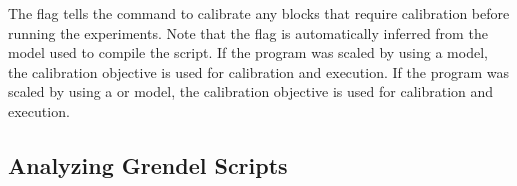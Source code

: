 The  flag tells the \expdriver command to calibrate any
blocks that require calibration before running the experiments. Note that the
 flag is automatically inferred from the model used to compile
the script. If the program was scaled by \lscale using a  model, the
 calibration objective is used for calibration and execution. If the program was
scaled by \lscale using a  or  model, the 
calibration objective is used for calibration and execution.

\subsection{Analyzing Grendel Scripts}
